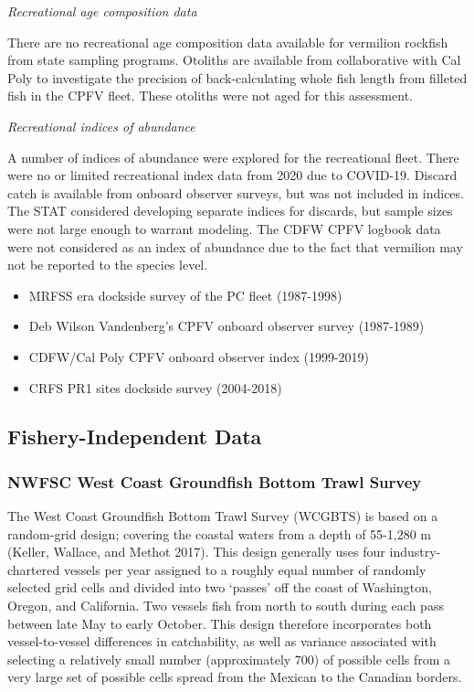 \documentclass[
  english,
  a4paper,
]{article}
\providecommand{\tightlist}{%
  \setlength{\itemsep}{0pt}\setlength{\parskip}{0pt}}
\begin{document}
\emph{Recreational age composition data}

There are no recreational age composition data available for vermilion rockfish from state sampling
programs.
Otoliths are available from collaborative with Cal Poly to investigate
the precision of back-calculating whole fish length from filleted fish in the CPFV fleet.
These otoliths were not aged for this assessment.

\emph{Recreational indices of abundance}

A number of indices of abundance were explored for the recreational fleet. There were no or limited recreational index data from 2020 due to COVID-19. Discard catch is available from onboard observer surveys, but was not included in indices. The STAT considered developing separate indices for discards, but sample sizes were not large enough to warrant modeling. The CDFW CPFV logbook data were not considered as an index of abundance due to the fact that
vermilion may not be reported to the species level.

\begin{itemize}
\tightlist
\item
  MRFSS era dockside survey of the PC fleet (1987-1998)
\item
  Deb Wilson Vandenberg's CPFV onboard observer survey (1987-1989)
\item
  CDFW/Cal Poly CPFV onboard observer index (1999-2019)
\item
  CRFS PR1 sites dockside survey (2004-2018)
\end{itemize}

\hypertarget{fishery-independent-data}{%
\subsection{Fishery-Independent Data}\label{fishery-independent-data}}

\hypertarget{nwfsc-west-coast-groundfish-bottom-trawl-survey}{%
\subsubsection{NWFSC West Coast Groundfish Bottom Trawl Survey}\label{nwfsc-west-coast-groundfish-bottom-trawl-survey}}

The West Coast Groundfish Bottom Trawl Survey (WCGBTS) is based on a random-grid design;
covering the coastal waters from a depth of 55-1,280 m (Keller, Wallace, and Methot 2017).
This design generally uses four industry-chartered vessels per year assigned to
a roughly equal number of randomly selected grid cells and divided into two `passes'
off the coast of Washington, Oregon, and California. Two vessels fish from north to south during each pass between late
May to early October. This design therefore incorporates both vessel-to-vessel
differences in catchability, as well as variance associated with selecting a
relatively small number (approximately 700) of possible cells from a very large
set of possible cells spread from the Mexican to the Canadian borders.
\end{document}
